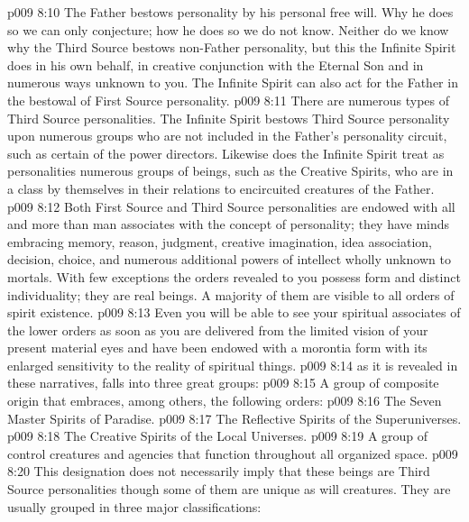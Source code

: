 \vs p009 8:10 \pc The Father bestows personality by his personal free will. Why he does so we can only conjecture; how he does so we do not know. Neither do we know why the Third Source bestows non\hyp{}Father personality, but this the Infinite Spirit does in his own behalf, in creative conjunction with the Eternal Son and in numerous ways unknown to you. The Infinite Spirit can also act for the Father in the bestowal of First Source personality.
\vs p009 8:11 \pc There are numerous types of Third Source personalities. The Infinite Spirit bestows Third Source personality upon numerous groups who are not included in the Father’s personality circuit, such as certain of the power directors. Likewise does the Infinite Spirit treat as personalities numerous groups of beings, such as the Creative Spirits, who are in a class by themselves in their relations to encircuited creatures of the Father.
\vs p009 8:12 Both First Source and Third Source personalities are endowed with all and more than man associates with the concept of personality; they have minds embracing memory, reason, judgment, creative imagination, idea association, decision, choice, and numerous additional powers of intellect wholly unknown to mortals. With few exceptions the orders revealed to you possess form and distinct individuality; they are real beings. A majority of them are visible to all orders of spirit existence.
\vs p009 8:13 Even you will be able to see your spiritual associates of the lower orders as soon as you are delivered from the limited vision of your present material eyes and have been endowed with a morontia form with its enlarged sensitivity to the reality of spiritual things.
\vs p009 8:14 \pc {} as it is revealed in these narratives, falls into three great groups:
\vs p009 8:15 \bibnobreakspace {} A group of composite origin that embraces, among others, the following orders:
\vs p009 8:16 \bibnobreakspace The Seven Master Spirits of Paradise.
\vs p009 8:17 \bibnobreakspace The Reflective Spirits of the Superuniverses.
\vs p009 8:18 \bibnobreakspace The Creative Spirits of the Local Universes.
\vs p009 8:19 \bibnobreakspace {} A group of control creatures and agencies that function throughout all organized space.
\vs p009 8:20 \bibnobreakspace {} This designation does not necessarily imply that these beings are Third Source personalities though some of them are unique as will creatures. They are usually grouped in three major classifications:
